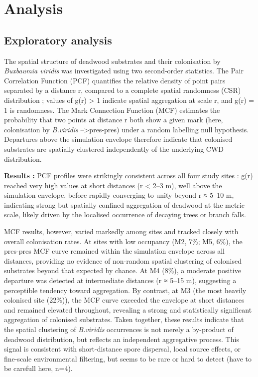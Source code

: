 \documentclass[
  letterpaper,
  DIV=11,
  numbers=noendperiod]{scrartcl}
\begin{document}
\section{Analysis}\label{analysis}

\subsection{Exploratory analysis}\label{exploratory-analysis}

The spatial structure of deadwood substrates and their colonisation by
\emph{Buxbaumia viridis} was investigated using two second-order
statistics. The Pair Correlation Function (PCF) quantifies the relative
density of point pairs separated by a distance r, compared to a complete
spatial randomness (CSR) distribution ; values of g(r) \textgreater{} 1
indicate spatial aggregation at scale r, and g(r) = 1 is randomness. The
Mark Connection Function (MCF) estimates the probability that two points
at distance r both show a given mark (here, colonisation by
\emph{B.viridis} --\textgreater pres-pres) under a random labelling null
hypothesis. Departures above the simulation envelope therefore indicate
that colonised substrates are spatially clustered independently of the
underlying CWD distribution.

\textbf{Results :} PCF profiles were strikingly consistent across all
four study sites : g(r) reached very high values at short distances (r
\textless{} 2--3 m), well above the simulation envelope, before rapidly
converging to unity beyond r ≈ 5--10 m, indicating strong but spatially
confined aggregation of deadwood at the metric scale, likely driven by
the localised occurrence of decaying trees or branch falls.

MCF results, however, varied markedly among sites and tracked closely
with overall colonisation rates. At sites with low occupancy (M2, 7\%;
M5, 6\%), the pres-pres MCF curve remained within the simulation
envelope across all distances, providing no evidence of non-random
spatial clustering of colonised substrates beyond that expected by
chance. At M4 (8\%), a moderate positive departure was detected at
intermediate distances (r ≈ 5--15 m), suggesting a perceptible tendency
toward aggregation. By contrast, at M3 (the most heavily colonised site
(22\%)), the MCF curve exceeded the envelope at short distances and
remained elevated throughout, revealing a strong and statistically
significant aggregation of colonised substrates. Taken together, these
results indicate that the spatial clustering of \emph{B.viridis}
occurrences is not merely a by-product of deadwood distribution, but
reflects an independent aggregative process. This signal is consistent
with short-distance spore dispersal, local source effects, or fine-scale
environmental filtering, but seems to be rare or hard to detect (have to
be carefull here, n=4).
\end{document}
